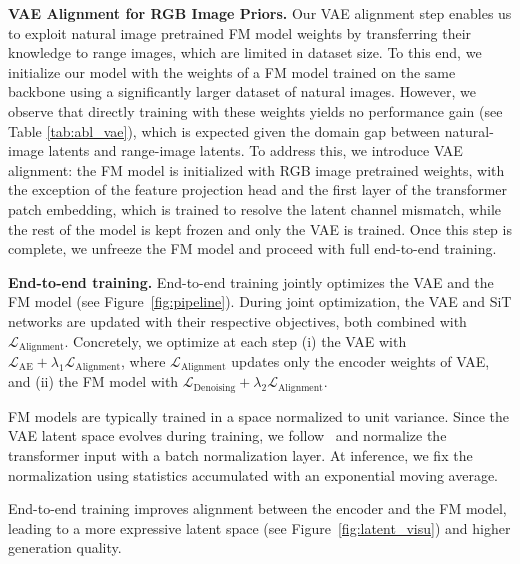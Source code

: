 \textbf{VAE Alignment for RGB Image Priors.}
Our VAE alignment step enables us to exploit natural image pretrained FM model weights by transferring their knowledge to range images, which are limited in dataset size.  
To this end, we initialize our model with the weights of a FM model trained on the same backbone using a significantly larger dataset of natural images. 
However, we observe that directly training with these weights yields no performance gain (see Table \ref{tab:abl_vae}), which is expected given the domain gap between natural-image latents and range-image latents. 
To address this, we introduce VAE alignment: the FM model is initialized with RGB image pretrained weights, with the exception of the feature projection head and the first layer of the transformer patch embedding, which is trained to resolve the latent channel mismatch, while the rest of the model is kept frozen and only the VAE is trained. 
 Once this step is complete, we unfreeze the FM model and proceed with full end-to-end training.
 

\textbf{End-to-end training.} End-to-end training jointly optimizes the VAE and the FM model (see Figure~\ref{fig:pipeline}).
During joint optimization, the VAE and SiT networks are updated with their respective objectives, both combined with $\mathcal{L}_{\text{Alignment}}$. Concretely, we optimize at each step (i) the VAE with $\mathcal{L}_{\text{AE}} + \lambda_1 \mathcal{L}_{\text{Alignment}}$, where $\mathcal{L}_{\text{Alignment}}$ updates only the encoder weights of VAE, and (ii) the FM model with $\mathcal{L}_{\text{Denoising}} + \lambda_2 \mathcal{L}_{\text{Alignment}}$.

FM models are typically trained in a space normalized to unit variance. Since the VAE latent space evolves during training, we follow~\cite{leng_repa-e_2025} and normalize the transformer input with a batch normalization layer. At inference, we fix the normalization using statistics accumulated with an exponential moving average.

End-to-end training improves alignment between the encoder and the FM model, leading to a more expressive latent space (see Figure~\ref{fig:latent_visu}) and higher generation quality.
